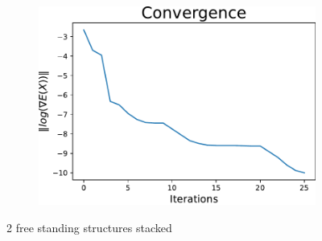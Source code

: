\begin{figure}[!ht]
\begin{subfigure}{.72\textwidth}
\end{subfigure}%
\begin{subfigure}{.3\textwidth}
  \centering
  \includegraphics[width=0.99\linewidth]{Bilder/2FREESTANDINGconv.pdf}
  \label{fig:sub2}
\end{subfigure}
\caption{2 free standing structures stacked}
\label{P69}
\end{figure}